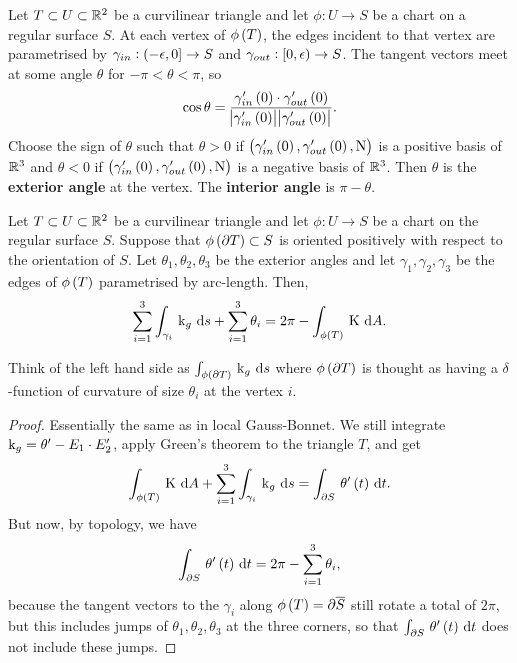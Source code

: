 Let $ T \subset U \subset \mathbb{R}^2 $ be a curvilinear triangle and let $ \phi : U \to S $ be a chart on a regular surface $ S $. At each vertex of $ \phi\br{T} $, the edges incident to that vertex are parametrised by $ \gamma_{in} : \intoc{-\epsilon, 0} \to S $ and $ \gamma_{out} : \intco{0, \epsilon} \to S $. The tangent vectors meet at some angle $ \theta $ for $ -\pi < \theta < \pi $, so
$$ \cos \theta = \dfrac{\gamma_{in}'\br{0} \cdot \gamma_{out}'\br{0}}{\abs{\gamma_{in}'\br{0}}\abs{\gamma_{out}'\br{0}}}. $$
Choose the sign of $ \theta $ such that $ \theta > 0 $ if $ \br{\gamma_{in}'\br{0}, \gamma_{out}'\br{0}, \N} $ is a positive basis of $ \mathbb{R}^3 $ and $ \theta < 0 $ if $ \br{\gamma_{in}'\br{0}, \gamma_{out}'\br{0}, \N} $ is a negative basis of $ \mathbb{R}^3 $. Then $ \theta $ is the \textbf{exterior angle} at the vertex. The \textbf{interior angle} is $ \pi - \theta $.

\begin{theorem}
Let $ T \subset U \subset \mathbb{R}^2 $ be a curvilinear triangle and let $ \phi : U \to S $ be a chart on the regular surface $ S $. Suppose that $ \phi\br{\partial T} \subset S $ is oriented positively with respect to the orientation of $ S $. Let $ \theta_1, \theta_2, \theta_3 $ be the exterior angles and let $ \gamma_1, \gamma_2, \gamma_3 $ be the edges of $ \phi\br{T} $ parametrised by arc-length. Then,
$$ \sum_{i = 1}^3 \intd{\gamma_i}{}{\k_g}{s} + \sum_{i = 1}^3 \theta_i = 2\pi - \intd{\phi\br{T}}{}{\K}{A}. $$
\end{theorem}

Think of the left hand side as $ \intd{\phi\br{\partial T}}{}{\k_g}{s} $ where $ \phi\br{\partial T} $ is thought as having a $ \delta $-function of curvature of size $ \theta_i $ at the vertex $ i $.

\begin{proof}
Essentially the same as in local Gauss-Bonnet. We still integrate $ \mathrm{k}_g = \theta' - E_1 \cdot E_2' $, apply Green's theorem to the triangle $ T $, and get
$$ \intd{\phi\br{T}}{}{\K}{A} + \sum_{i = 1}^3 \intd{\gamma_i}{}{\k_g}{s} = \intd{\partial S}{}{\theta'\br{t}}{t}. $$
But now, by topology, we have
$$ \intd{\partial S}{}{\theta'\br{t}}{t} = 2\pi - \sum_{i = 1}^3 \theta_i, $$
because the tangent vectors to the $ \gamma_i $ along $ \phi\br{T} = \partial\overline{S} $ still rotate a total of $ 2\pi $, but this includes jumps of $ \theta_1, \theta_2, \theta_3 $ at the three corners, so that $ \intd{\partial S}{}{\theta'\br{t}}{t} $ does not include these jumps.
\end{proof}

